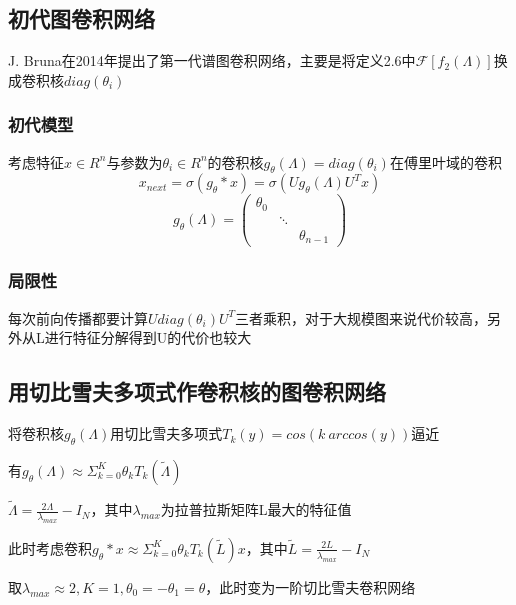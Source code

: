 \subsection{初代图卷积网络}
J. Bruna在2014年提出了第一代谱图卷积网络\cite{gcn_spectral}，主要是将定义2.6中$\mathcal{F}[f_2(\Lambda)]$换成卷积核$diag(\theta_i)$

\subsubsection{初代模型}
\begin{definition}
    考虑特征$x \in R^n$与参数为$\theta_i\in R^n$的卷积核$g_\theta(\Lambda)=diag(\theta_i)$在傅里叶域的卷积
    \begin{equation}
        x_{next}=\sigma (g_\theta*x)=\sigma (U g_\theta(\Lambda) U^Tx)
    \end{equation}
    \begin{equation}
        g_\theta(\Lambda)=\left(\begin{array}{ccc}
        \theta_{0} & & \\
        & \ddots & \\
        & & \theta_{n-1}
        \end{array}\right)
    \end{equation}
\end{definition}

\subsubsection{局限性}
每次前向传播都要计算$U diag(\theta_i) U^T$三者乘积，对于大规模图来说代价较高，另外从L进行特征分解得到U的代价也较大

\subsection{用切比雪夫多项式作卷积核的图卷积网络}
将卷积核$g_\theta(\Lambda)$用切比雪夫多项式$T_k(y)=cos(k\ arccos(y))$逼近\cite{gcn_cheb}

有$g_\theta(\Lambda)\approx \Sigma_{k=0}^K\theta_kT_k(\tilde \Lambda)$

$\tilde \Lambda=\frac{2\Lambda}{\lambda_{max}}-I_N$，其中$\lambda_{max}$为拉普拉斯矩阵L最大的特征值

此时考虑卷积$g_\theta*x\approx \Sigma_{k=0}^K\theta_kT_k(\tilde L)x$，其中$\tilde L=\frac{2L}{\lambda_{max}}-I_N$

取$\lambda_{max}\approx2,K=1,\theta_0=-\theta_1=\theta$，此时变为一阶切比雪夫卷积网络\cite{gcn}

